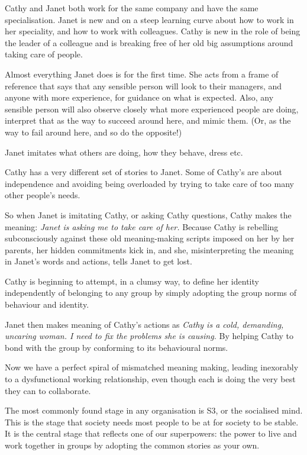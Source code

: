 \begin{longstoryblock}
Cathy and Janet both work for the same company and have the same specialisation. Janet is new and on a steep learning curve about how to work in her speciality, and how to work with colleagues. Cathy is new in the role of being the leader of a colleague and is breaking free of her old big assumptions around taking care of people. 


Almost everything Janet does is for the first time. She acts from a frame of reference that says that any sensible person will look to their managers, and anyone with more experience, for guidance on what is expected. Also, any sensible person will also observe closely what more experienced people are doing, interpret that as the way to succeed around here, and mimic them. (Or, as the way to fail around here, and so do the opposite!)


Janet imitates what others are doing, how they behave, dress etc. 


Cathy has a very different set of stories to Janet. Some of Cathy's are about independence and avoiding being overloaded by trying to take care of too many other people’s needs. 


So when Janet is imitating Cathy, or asking Cathy questions, Cathy makes the meaning: \emph{Janet is asking me to take care of her.} Because Cathy is rebelling subconsciously against these old meaning-making scripts imposed on her by her parents, her hidden commitments kick in, and she, misinterpreting the meaning in Janet's words and actions, tells Janet to get lost.


Cathy is beginning to attempt, in a clumsy way, to define her identity independently of belonging to any group by simply adopting the group norms of behaviour and identity.


Janet then makes meaning of Cathy's actions as \emph{ Cathy is a cold, demanding, uncaring woman. I need to fix the problems she is causing.} By helping Cathy to bond with the group by conforming to its behavioural norms. 


Now we have a perfect spiral of mismatched meaning making, leading inexorably to a dysfunctional working relationship, even though each is doing the very best they can to collaborate.
\end{longstoryblock}


The most commonly found stage in any organisation is S3, or the socialised mind. This is the stage that society needs most people to be at for society to be stable. It is the central stage that reflects one of our superpowers: the power to live and work together in groups by adopting the common stories as your own. 


